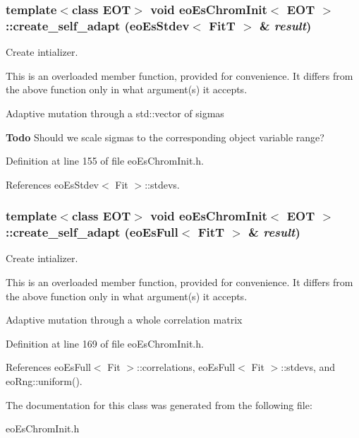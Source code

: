 \subsubsection{\setlength{\rightskip}{0pt plus 5cm}template$<$class EOT$>$ void {\bf eo\-Es\-Chrom\-Init}$<$ {\bf EOT} $>$::create\_\-self\_\-adapt ({\bf eo\-Es\-Stdev}$<$ Fit\-T $>$ \& {\em result})\hspace{0.3cm}{\tt  [inline, private]}}\label{classeo_es_chrom_init_d2}


Create intializer. 

This is an overloaded member function, provided for convenience. It differs from the above function only in what argument(s) it accepts.

Adaptive mutation through a std::vector of sigmas

\begin{Desc}
\item[{\bf Todo}]Should we scale sigmas to the corresponding object variable range? \end{Desc}


Definition at line 155 of file eo\-Es\-Chrom\-Init.h.

References eo\-Es\-Stdev$<$ Fit $>$::stdevs.
\subsubsection{\setlength{\rightskip}{0pt plus 5cm}template$<$class EOT$>$ void {\bf eo\-Es\-Chrom\-Init}$<$ {\bf EOT} $>$::create\_\-self\_\-adapt ({\bf eo\-Es\-Full}$<$ Fit\-T $>$ \& {\em result})\hspace{0.3cm}{\tt  [inline, private]}}\label{classeo_es_chrom_init_d3}


Create intializer. 

This is an overloaded member function, provided for convenience. It differs from the above function only in what argument(s) it accepts.

Adaptive mutation through a whole correlation matrix 

Definition at line 169 of file eo\-Es\-Chrom\-Init.h.

References eo\-Es\-Full$<$ Fit $>$::correlations, eo\-Es\-Full$<$ Fit $>$::stdevs, and eo\-Rng::uniform().

The documentation for this class was generated from the following file:\begin{CompactItemize}
\item 
eo\-Es\-Chrom\-Init.h\end{CompactItemize}
